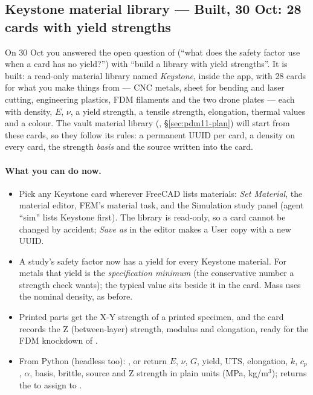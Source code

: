 \subsection{Keystone material library --- Built, 30 Oct: 28 cards with yield strengths}\label{sec:materials-built}

On 30 Oct you answered the open question of  (``what does the safety factor use when a card has no
yield?'') with ``build a library with yield strengths''. It is built: a read-only material library named
\emph{Keystone}, inside the app, with 28 cards for what you make things from --- CNC metals, sheet for bending and
laser cutting, engineering plastics, FDM filaments and the two drone plates --- each with density, $E$, $\nu$, a yield
strength, a tensile strength, elongation, thermal values and a colour. The vault material library (,
\S\ref{sec:pdm11-plan}) will start from these cards, so they follow its rules: a permanent UUID per card, a density
on every card, the strength \emph{basis} and the source written into the card.

\paragraph{What you can do now.}
\begin{itemize}[nosep]
  \item Pick any Keystone card wherever FreeCAD lists materials: \emph{Set Material}, the material editor, FEM's
        material task, and the Simulation study panel (agent ``sim'' lists Keystone first). The library is read-only,
        so a card cannot be changed by accident; \emph{Save as} in the editor makes a User copy with a new UUID.
  \item A study's safety factor now has a yield for every Keystone material. For metals that yield is the
        \emph{specification minimum} (the conservative number a strength check wants); the typical value sits beside
        it in the card. Mass uses the nominal density, as before.
  \item Printed parts get the X-Y strength of a printed specimen, and the card records the Z (between-layer)
        strength, modulus and elongation, ready for the FDM knockdown of .
  \item From Python (headless too): ,  or
         return $E$, $\nu$, $G$, yield, UTS, elongation, $k$, $c_p$, $\alpha$, basis, brittle, source
        and Z strength in plain units (MPa, kg/m$^3$);  returns the
         to assign to .
\end{itemize}

